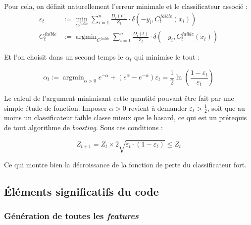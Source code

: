 \documentclass[12pt,a4paper]{article}
\DeclareMathOperator*{\argmin}{argmin}
\begin{document}
Pour cela, on définit naturellement l'erreur minimale et le classificateur associé :
\begin{equation*}
\begin{split}
    \varepsilon_t & := \min_{C^{faible}} \sum_{i=1}^n \frac{D_i(t)}{Z_t} \cdot \delta(-y_i, C_t^{faible}(x_i)) \\
    {C_t^{faible}} & := \argmin_{C^{faible}} \sum_{i=1}^n \frac{D_i(t)}{Z_t} \cdot \delta(-y_i, C_t^{faible}(x_i))
\end{split}
\end{equation*}

Et l'on choisit dans un second temps le $\alpha_t$ qui minimise le tout :

\begin{equation*}
    \alpha_t := \argmin_{\alpha > 0} e^{-\alpha} +  (e^{\alpha} - e^{-\alpha}) \varepsilon_t = \frac{1}{2} \ln\left(\frac{1-\varepsilon_t}{\varepsilon_t}\right)
\end{equation*}

Le calcul de l'argument minimisant cette quantité pouvant être fait par une simple étude de fonction. Imposer $\alpha > 0$ revient à demander $\varepsilon_t > \frac{1}{2}$, soit que au moins un classificateur faible classe mieux que le hasard, ce qui est un prérequis de tout algorithme de \textit{boosting}. Sous ces conditions :

\begin{equation}
    Z_{t+1} = Z_t \times 2 \sqrt{\varepsilon_t \cdot (1 - \varepsilon_t)} \leq Z_t
\end{equation}

Ce qui montre bien la décroissance de la fonction de perte du classificateur fort.

\subsection{Éléments significatifs du code}
\subsubsection{Génération de toutes les \textit{features}}
\label{sec:construction-features}
\end{document}
